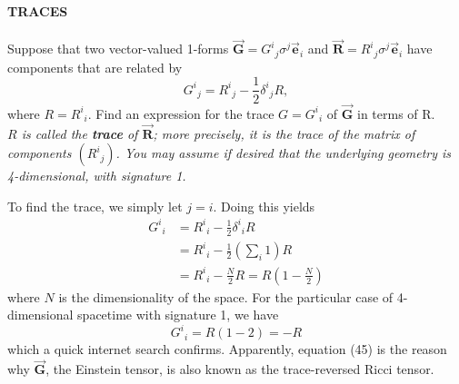 \documentclass[a4paper, 11pt]{article}
\newcommand{\bvec}[1]{\vec{\boldsymbol{#1}}}
\newenvironment{solution}{%
	\begin{list}{}{%
			\setlength{\topsep}{0pt}%
			\setlength{\leftmargin}{0.5cm}%
			\setlength{\rightmargin}{0.5cm}%
			\setlength{\listparindent}{\parindent}%
			\setlength{\itemindent}{\parindent}%
			\setlength{\parsep}{\parskip}%
		}%
		\item[]}{\end{list}}
\begin{document}
\begin{enumerate}[leftmargin=0em, label=\textbf{\arabic*}.]
\item \textbf{TRACES}\\\\
  \noindent Suppose that two vector-valued 1-forms
  $\bvec{G}=G^i{}_j\sigma^j\bvec{e}_i$ and $\bvec{R}=R^i{}_j\sigma^j\bvec{e}_i$
  have components that are related by
  \begin{equation}
    G^i{}_j = R^i{}_j - \frac{1}{2}\delta^i{}_jR, 
  \end{equation}
  where $R=R^i{}_i$. Find an expression for the trace $G=G^i{}_i$ of $\bvec{G}$
  in terms of R. \\
  \noindent\textit{$R$ is called the \textbf{trace} of $\bvec{R}$; more
    precisely, it is the trace of the matrix of components
    $\left(R^i{}_j\right)$. You may assume if desired that the underlying
    geometry is 4-dimensional, with signature 1.}\\
  \begin{solution}
    To find the trace, we simply let $j=i$. Doing this yields
    \begin{align}
      G^i{}_i &= R^i{}_i-\frac{1}{2}\delta^i{}_iR\\
              &= R^i{}_i-\frac{1}{2}\left(\sum_i 1\right) R \\
      &= R^{i}{}_i - \frac{N}{2}R = R\left(1-\frac{N}{2}\right)
    \end{align}
    where $N$ is the dimensionality of the space. For the particular case of
    4-dimensional spacetime with signature 1, we have
    \begin{equation}
      G^i{}_i = R(1-2) = -R 
    \end{equation}
    which a quick internet search confirms. Apparently, equation (45) is the
    reason why $\bvec{G}$, the Einstein tensor, is also known as the
    trace-reversed Ricci tensor.
  \end{solution}
  
\end{enumerate}

 
\end{document}
